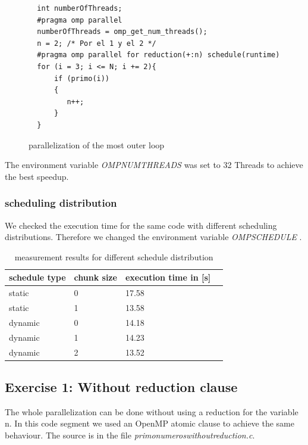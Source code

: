 \documentclass[11pt,a4paper]{article}
\begin{document}
\begin{figure}[h]
\label{code_mostouterloop}
\begin{lstlisting}
  int numberOfThreads;
  #pragma omp parallel
  numberOfThreads = omp_get_num_threads();
  n = 2; /* Por el 1 y el 2 */
  #pragma omp parallel for reduction(+:n) schedule(runtime)
  for (i = 3; i <= N; i += 2){
      if (primo(i))
      {
         n++;
      }
  }
\end{lstlisting} 
\caption{parallelization of the most outer loop}
\end{figure} 

The environment variable \textit{OMP\textunderscore NUM\textunderscore THREADS} was set to 32 Threads to achieve the best speedup.\\

\pagebreak

\subsubsection{scheduling distribution}

We checked the execution time for the same code with different scheduling distributions. Therefore we changed the environment variable \textit{OMP\textunderscore SCHEDULE} .

\begin{table}[h]
\centering
\label{table_scheduledistribution}
\begin{tabular}{| l | l | l | l |}
    \hline
    schedule type & chunk size & execution time in [s]\\ 
    \hline
	static & 0 & 17.58 \\
	\hline
	static & 1 & 13.58 \\
    \hline
	dynamic & 0 & 14.18 \\
    \hline
    dynamic & 1 & 14.23 \\
    \hline
    dynamic & 2 & 13.52 \\
    \hline
\end{tabular}
\caption{measurement results for different schedule distribution}
\end{table}

\subsection{Exercise 1: Without reduction clause}
\label{ex21}

The whole parallelization can be done without using a reduction for the variable n. In this code segment we used an OpenMP atomic clause to achieve the same behaviour.
The source is in the file \textit{primo\textunderscore numeros\textunderscore without\textunderscore reduction.c}.
\end{document}
